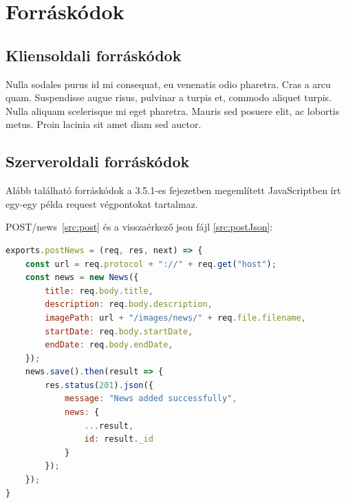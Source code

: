 



\section{Forráskódok} %

\subsection{Kliensoldali forráskódok}
Nulla sodales purus id mi consequat, eu venenatis odio pharetra. Cras a arcu quam. Suspendisse augue risus, pulvinar a turpis et, commodo aliquet turpis. Nulla aliquam scelerisque mi eget pharetra. Mauris sed posuere elit, ac lobortis metus. Proin lacinia sit amet diam sed auctor.

\subsection{Szerveroldali forráskódok}
Alább található forráskódok a 3.5.1-es fejezetben megemlített JavaScriptben írt egy-egy példa request végpontokat tartalmaz.

POST/news~\ref{src:post} és a visszaérkező json fájl \ref{src:postJson}:

\begin{lstlisting}[language=JavaScript]
exports.postNews = (req, res, next) => {
	const url = req.protocol + "://" + req.get("host");
	const news = new News({
		title: req.body.title,
		description: req.body.description,
		imagePath: url + "/images/news/" + req.file.filename,
		startDate: req.body.startDate,
		endDate: req.body.endDate,
	});
	news.save().then(result => {
		res.status(201).json({
			message: "News added successfully",
			news: {
				...result,
				id: result._id
			}
		});
	});
}
\end{lstlisting}

